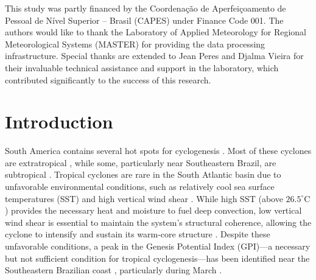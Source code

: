\documentclass[pdflatex,sn-chicago]{sn-jnl}%
\theoremstyle{plain}
\theoremstyle{definition}
\theoremstyle{remark}
\theoremstyle{definition}
\begin{document}
This study was partly financed by the Coordenação de Aperfeiçoamento de Pessoal de Nível Superior – Brasil (CAPES) under Finance Code 001. The authors would like to thank the Laboratory of Applied Meteorology for Regional Meteorological Systems (MASTER) for providing the data processing infrastructure. Special thanks are extended to Jean Peres and Djalma Vieira for their invaluable technical assistance and support in the laboratory, which contributed significantly to the success of this research.

\section{Introduction}

South America contains several hot spots for cyclogenesis \citep{gan1991surface,reboita2010south,gramcianinov2019properties,couto2024new}. Most of these cyclones are extratropical \citep{marrafon2022classificaccao}, while some, particularly near Southeastern Brazil, are subtropical \citep{gozzo2014subtropical,gozzo2017climatology}. Tropical cyclones are rare in the South Atlantic basin due to unfavorable environmental conditions, such as relatively cool sea surface temperatures (SST) and high vertical wind shear \citep{pezza2005first}. While high SST (above $26.5^{\circ}\text{C}$) provides the necessary heat and moisture to fuel deep convection, low vertical wind shear is essential to maintain the system’s structural coherence, allowing the cyclone to intensify and sustain its warm-core structure \citep{gray1968global,emanuel1986air,davis2003baroclinically,rios2024review}. Despite these unfavorable conditions, a peak in the Genesis Potential Index (GPI)—a necessary but not sufficient condition for tropical cyclogenesis—has been identified near the Southeastern Brazilian coast \citep{camargo2007tropical}, particularly during March \citep{andrelina2021climatologia}.
\end{document}
